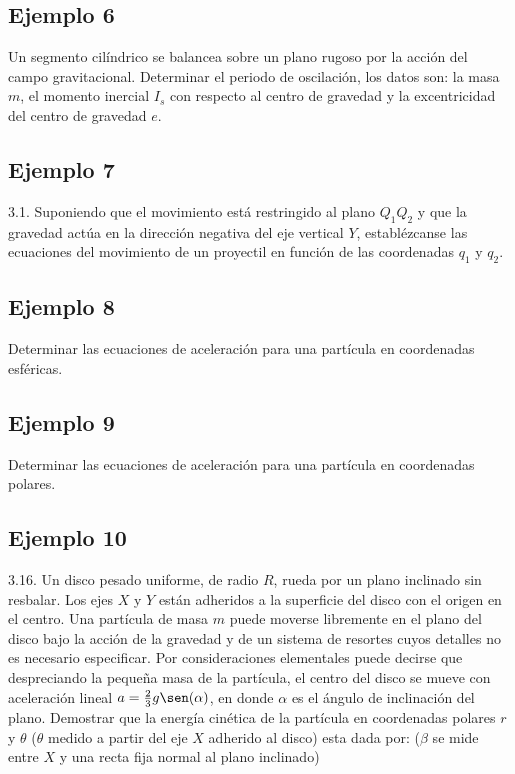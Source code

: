 \subsection{Ejemplo 6}
Un segmento cilíndrico se balancea sobre un plano rugoso por la acción del campo
gravitacional. Determinar el periodo de oscilación, los datos son: la masa $m$,
el momento inercial $I_s$ con respecto al centro de gravedad y la excentricidad
del centro de gravedad $e$.

\subsection{Ejemplo 7}
3.1. Suponiendo que el movimiento está restringido al plano $Q_1 Q_2$ y que la
gravedad actúa en la dirección negativa del eje vertical $Y$, establézcanse las
ecuaciones del movimiento de un proyectil en función de las coordenadas $q_1$ y
$q_2$.


\subsection{Ejemplo 8}
Determinar las ecuaciones de aceleración para una partícula en coordenadas
esféricas.

\subsection{Ejemplo 9}
Determinar las ecuaciones de aceleración para una partícula en coordenadas
polares.

\subsection{Ejemplo 10}
3.16. Un disco pesado uniforme, de radio $R$, rueda por un plano inclinado sin
resbalar. Los ejes $X$ y $Y$ están adheridos a la superficie del disco con el
origen en el centro. Una partícula de masa $m$ puede moverse libremente en el
plano del disco bajo la acción de la gravedad y de un sistema de resortes cuyos
detalles no es necesario especificar. Por consideraciones elementales puede
decirse que despreciando  la pequeña masa de la partícula, el centro del disco
se mueve con aceleración lineal $a=\frac{2}{3}g\sen(\alpha)$, en donde $\alpha$
es el ángulo de inclinación del plano. Demostrar que la energía cinética de la
partícula en coordenadas polares $r$ y $\theta$ ($\theta$ medido a partir del
eje $X$ adherido al disco) esta dada por: ($\beta$ se mide entre $X$ y una recta
fija normal al plano inclinado)

